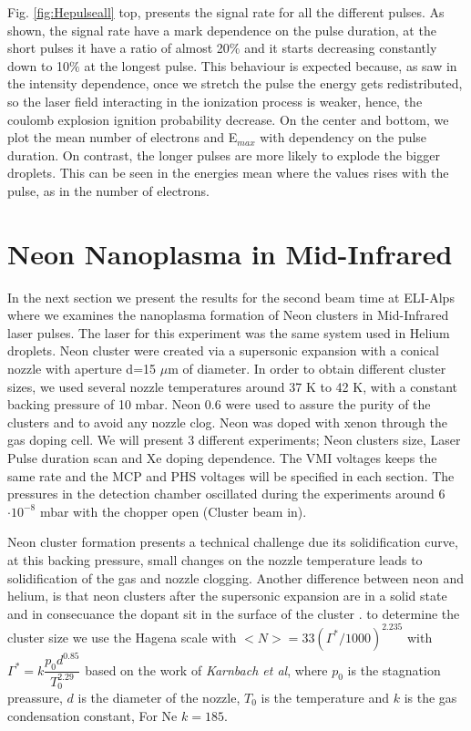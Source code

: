 Fig. \ref{fig:Hepulseall} top, presents the signal rate for all the different pulses. As shown, the signal rate have a mark dependence on the  pulse duration, at the short pulses it have a ratio of almost 20$\%$  and it starts decreasing constantly  down to  10$\%$ at the longest pulse.  This behaviour is expected because, as saw in the intensity dependence, once we stretch the pulse the energy gets redistributed, so the laser field interacting in the ionization process is weaker, hence, the coulomb explosion ignition probability decrease. On the center and bottom, we plot the mean number of electrons and E$_{max}$  with dependency on the pulse duration. On contrast, the longer pulses are more likely to explode the bigger droplets. This can be seen in the energies mean where the values rises with the pulse, as in the number of electrons. 


\section{Neon Nanoplasma in Mid-Infrared}

In the next section we present the results for the second beam time at ELI-Alps where we examines the nanoplasma formation of Neon clusters in Mid-Infrared laser pulses. The laser for this experiment was the same system used in Helium droplets. Neon cluster were created via a supersonic expansion with a conical nozzle with aperture d=15 $\mu$m of diameter. In order to obtain different cluster sizes, we used several nozzle temperatures around 37 K to 42 K, with a constant backing pressure of 10 mbar. Neon 0.6 were used to assure the purity of the clusters and to avoid any nozzle clog. Neon was doped with xenon through the gas doping cell. We will present 3 different experiments; Neon clusters size, Laser Pulse duration scan and Xe doping dependence. The VMI voltages keeps the same rate and the MCP and PHS voltages will be specified in each section. The pressures in the detection chamber oscillated during the experiments around 6$\cdot10^{-8}$ mbar with the chopper open (Cluster beam in).  

Neon cluster formation presents a technical challenge due its solidification curve, at this backing pressure, small changes on the nozzle temperature leads to solidification of the gas and nozzle clogging. Another difference between neon and helium, is that neon clusters after the supersonic expansion are in a solid state and in consecuance the dopant sit in the surface of the cluster \cite{von_pietrowski_fluorescence_1997}.  to determine the cluster size we use the  Hagena scale with $<N>=33(\Gamma^{*}/1000)^{2.235}$ \cite{hagena_cluster_1972} with $\Gamma^{*}=k\dfrac{p_{0}d^{0.85}}{T_{0}^{2.29}}$  based on the work of \textit{Karnbach et al}\cite{karnbach_clulu:_1993}, where $p_0$ is the stagnation preassure, $d$ is the diameter of the nozzle, $T_0$ is the temperature and $k$ is the gas condensation constant, For Ne $k=185$\cite{karnbach_clulu:_1993}. 

